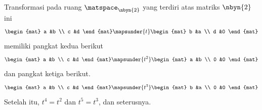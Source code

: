 \begin{example}
Transformasi pada ruang $\matspace_{\nbyn{2}}$ yang terdiri atas matriks
$\nbyn{2}$ ini
\begin{equation*}
  \begin{mat}
    a  &b  \\
    c  &d
  \end{mat}
  \mapsunder{t}
  \begin{mat}
    b  &a  \\
    d  &0
  \end{mat}
\end{equation*}
memiliki pangkat kedua berikut
\begin{equation*}
  \begin{mat}
    a  &b  \\
    c  &d
  \end{mat}
  \mapsunder{t^2}
  \begin{mat}
    a  &b  \\
    0  &0
  \end{mat}
\end{equation*}
dan pangkat ketiga berikut.
\begin{equation*}
  \begin{mat}
    a  &b  \\
    c  &d
  \end{mat}
  \mapsunder{t^3}
  \begin{mat}
    b  &a  \\
    0  &0
  \end{mat}
\end{equation*}
Setelah itu, $t^4=t^2$ dan $t^5=t^3$, dan seterusnya.
\end{example}

